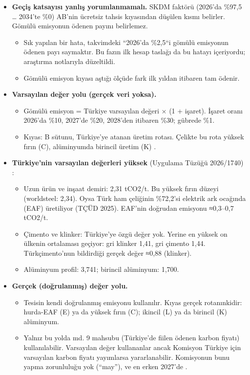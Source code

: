 \begin{itemize}
\tightlist
\item
  \textbf{Geçiş katsayısı yanlış yorumlanmamalı.} SKDM faktörü (2026'da \%97,5 \ldots{} 2034'te \%0) AB'nin ücretsiz tahsis kıyasından düşülen kısmı belirler. Gömülü emisyonun ödenen payını belirlemez.

  \begin{itemize}
  \tightlist
  \item
    Sık yapılan bir hata, takvimdeki ``2026'da \%2,5``i gömülü emisyonun ödenen payı saymaktır. Bu fazın ilk hesap taslağı da bu hatayı içeriyordu; araştırma notlarıyla düzeltildi.
  \item
    Gömülü emisyon kıyası aştığı ölçüde fark ilk yıldan itibaren tam ödenir.
  \end{itemize}
\item
  \textbf{Varsayılan değer yolu (gerçek veri yoksa).}

  \begin{itemize}
  \tightlist
  \item
    Gömülü emisyon = Türkiye varsayılan değeri × (1 + işaret). İşaret oranı 2026'da \%10, 2027'de \%20, 2028'den itibaren \%30; gübrede \%1.
  \item
    Kıyas: B sütunu, Türkiye'ye atanan üretim rotası. Çelikte bu rota yüksek fırın (C), alüminyumda birincil üretim (K) \etiketV{}.
  \end{itemize}
\item
  \textbf{Türkiye'nin varsayılan değerleri yüksek} (Uygulama Tüzüğü 2026/1740) \etiketV{}:

  \begin{itemize}
  \tightlist
  \item
    Uzun ürün ve inşaat demiri: 2,31 tCO2/t. Bu yüksek fırın düzeyi (worldsteel: 2,34). Oysa Türk ham çeliğinin \%72,2'si elektrik ark ocağında (EAF) üretiliyor (TÇÜD 2025). EAF'nin doğrudan emisyonu ≈0,3--0,7 tCO2/t.
  \item
    Çimento ve klinker: Türkiye'ye özgü değer yok. Yerine en yüksek on ülkenin ortalaması geçiyor: gri klinker 1,41, gri çimento 1,44. Türkçimento'nun bildirdiği gerçek değer ≈0,88 (klinker).
  \item
    Alüminyum profil: 3,741; birincil alüminyum: 1,700.
  \end{itemize}
\item
  \textbf{Gerçek (doğrulanmış) değer yolu.}

  \begin{itemize}
  \tightlist
  \item
    Tesisin kendi doğrulanmış emisyonu kullanılır. Kıyas gerçek rotanınkidir: hurda-EAF (E) ya da yüksek fırın (C); ikincil (L) ya da birincil (K) alüminyum.
  \item
    Yalnız bu yolda md. 9 mahsubu (Türkiye'de fiilen ödenen karbon fiyatı) kullanılabilir. Varsayılan değer kullananlar ancak Komisyon Türkiye için varsayılan karbon fiyatı yayımlarsa yararlanabilir. Komisyonun bunu yapma zorunluluğu yok (``may''), ve en erken 2027'de \etiketV{}.
  \end{itemize}
\end{itemize}

